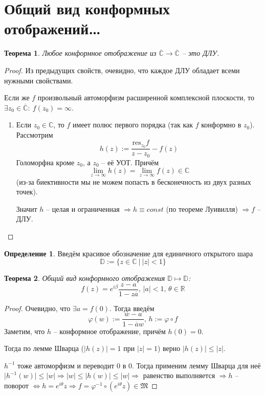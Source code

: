 \documentclass[a4paper,12pt]{article}
\renewcommand{\phi}{\ensuremath{\varphi}}
\renewcommand{\leq}{\ensuremath{\leqslant}}
\theoremstyle{plain}
\newtheorem{theorem}{Теорема}[section]
\theoremstyle{definition}
\newtheorem{definition}{Определение}[section]
\theoremstyle{remark}
\begin{document}
\section{Общий вид конформных отображений\dots}
\begin{theorem}
	Любое конформное отображение из $\overline{\mathbb{C}} \to \overline{\mathbb{C}}$ -- это ДЛУ.
\end{theorem}

\begin{proof}
	Из предыдущих свойств, очевидно, что каждое ДЛУ обладает всеми нужными свойствами.

	Если же $f$ произвольный автоморфизм расширенной комплексной плоскости, то $\exists z_0 \in \overline{\mathbb{C}} :\: f(z_0) = \infty$. 

	\begin{enumerate}
		\item Если $z_0 \in \mathbb{C}$, то $f$ имеет полюс первого порядка (так как $f$ конформно в $z_0$). Рассмотрим
		\[
			h(z) := \frac{\text{res}_{z_0}f}{z - z_0} - f(z)
		\]
		Голоморфна кроме $z_0$, а $z_0$ -- её УОТ. Причём
		\[
			\lim_{z \to \infty}h(z) = \lim_{z \to \infty}f(z) \in \mathbb{C}
		\]
		(из-за биективности мы не можем попасть в бесконечность из двух разных точек).

		Значит $h$ -- целая и ограниченная $\Rightarrow h \equiv const$ (по теореме Луивилля) $\Rightarrow f$ -- ДЛУ. 
	\end{enumerate}
\end{proof}

\begin{definition}
	Введём красивое обозначение для единичного открытого шара
	\[
		\mathbb{D} := \{z \in \mathbb{C} \:\vert\: \vert z\vert < 1\}
	\]
\end{definition}

\begin{theorem}
	Общий вид конформного отображения $\mathbb{D} \mapsto \mathbb{D}$:
	\[
		f(z) = e^{i\beta}\frac{z - a}{1 - z\overline{a}},\, \vert a\vert < 1,\, \theta \in \mathbb{R}
	\]
\end{theorem}

\begin{proof}
	Очевидно, что $\exists a = f(0)$. Тогда введём
	\[
		\phi(w) := \frac{w - a}{1 - \overline{a}w},\, h := \phi\circ f
	\]
	Заметим, что $h$ -- конформное отображение, причём $h(0) = 0$.

	Тогда по лемме Шварца ($\vert h(z)\vert = 1$ при $\vert z\vert = 1$) верно $\vert h(z)\vert\leq\vert z\vert$.

	$h^{-1}$ тоже автоморфизм и переводит $0$ в $0$. Тогда применим лемму Шварца для неё $\vert h^{-1}(w)\vert \leq \vert w\vert \Rightarrow \vert w\vert \leq \vert h(w)\vert \leq \vert w\vert \Rightarrow$ равенство выполняется $\Rightarrow h$ -- поворот $\Leftrightarrow h = e^{i\theta}z \Rightarrow f = \phi^{-1}\circ(e^{i\theta}z) \in \mathfrak{M}$
\end{proof}
\end{document}
